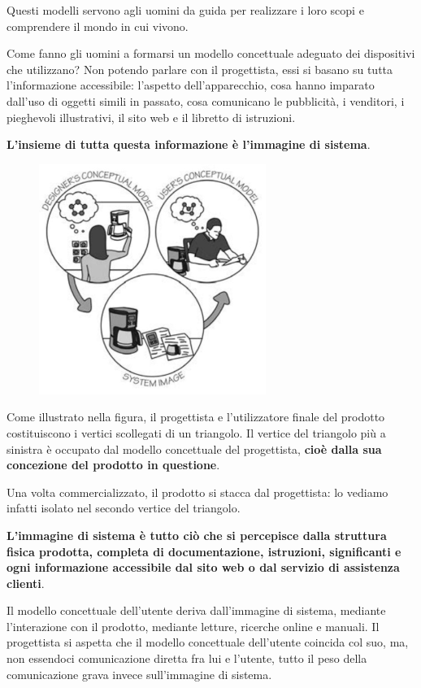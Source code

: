Questi modelli servono agli uomini da guida per realizzare i loro scopi e comprendere il mondo in cui vivono.

Come fanno gli uomini a formarsi un modello concettuale adeguato dei dispositivi che utilizzano? Non potendo parlare con il progettista, essi si basano su tutta l'informazione accessibile: l'aspetto dell'apparecchio, cosa hanno imparato dall'uso di oggetti simili in passato, cosa comunicano le pubblicità, i venditori, i pieghevoli illustrativi, il sito web e il libretto di istruzioni.

\textbf{L'insieme di tutta questa informazione è l'immagine di sistema}.

\begin{figure}[!h]
	\centering
	\includegraphics[scale = 0.75]{"immagini/Immagine di Sistema"}
\end{figure}

Come illustrato nella figura, il progettista e l'utilizzatore finale del prodotto costituiscono i vertici scollegati di un triangolo. Il vertice del triangolo più a sinistra è occupato dal modello concettuale del progettista, \textbf{cioè dalla sua concezione del prodotto in questione}.

Una volta commercializzato, il prodotto si stacca dal progettista: lo vediamo infatti isolato nel secondo vertice del triangolo.

\textbf{L'immagine di sistema è tutto ciò che si percepisce dalla struttura fisica prodotta, completa di documentazione, istruzioni, significanti e ogni informazione accessibile dal sito web o dal servizio di assistenza clienti}.

Il modello concettuale dell'utente deriva dall'immagine di sistema, mediante l'interazione con il prodotto, mediante letture, ricerche online e manuali. Il progettista si aspetta che il modello concettuale dell'utente coincida col suo, ma, non essendoci comunicazione diretta fra lui e l'utente, tutto il peso della comunicazione grava invece sull'immagine di sistema.


